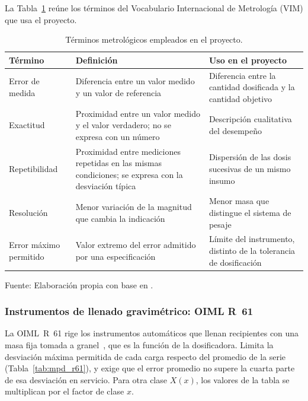 La Tabla~\ref{tab:terminos_vim} reúne los términos del Vocabulario
Internacional de Metrología (VIM) que usa el proyecto.

\begin{table}[H]
    \centering
    \caption{Términos metrológicos empleados en el proyecto.}
    \label{tab:terminos_vim}
    \footnotesize
    \setlength{\tabcolsep}{3pt}
    \renewcommand{\arraystretch}{1.25}

    \begin{tabularx}{\textwidth}{
        >{\raggedright\arraybackslash}p{}
        >{\raggedright\arraybackslash}X
        >{\raggedright\arraybackslash}p{}}
        \toprule[1pt]
        \textbf{Término} & \textbf{Definición} & \textbf{Uso en el proyecto} \\
        \midrule[1pt]
        Error de medida & Diferencia entre un valor medido y un valor de
        referencia & Diferencia entre la cantidad dosificada y la cantidad
        objetivo \\
        Exactitud & Proximidad entre un valor medido y el valor verdadero; no
        se expresa con un número & Descripción cualitativa del desempeño \\
        Repetibilidad & Proximidad entre mediciones repetidas en las mismas
        condiciones; se expresa con la desviación típica & Dispersión de las
        dosis sucesivas de un mismo insumo \\
        Resolución & Menor variación de la magnitud que cambia la indicación &
        Menor masa que distingue el sistema de pesaje \\
        Error máximo permitido & Valor extremo del error admitido por una
        especificación & Límite del instrumento, distinto de la tolerancia de
        dosificación \\
        \bottomrule[1pt]
    \end{tabularx}

    \vspace{2pt}
    {\footnotesize Fuente: Elaboración propia con base en \textcite{jcgm2012vim}.}
\end{table}

\subsubsection{Instrumentos de llenado gravimétrico: OIML R~61}
\label{subsubsec:fund_r61}

La OIML~R~61 rige los instrumentos automáticos que llenan recipientes con una
masa fija tomada a granel~\parencite{oiml2017r61}, que es la función de la
dosificadora. Limita la desviación máxima permitida de cada carga respecto del
promedio de la serie (Tabla~\ref{tab:mpd_r61}), y exige que el error promedio no
supere la cuarta parte de esa desviación en servicio. Para otra clase $X(x)$, los
valores de la tabla se multiplican por el factor de clase $x$.

